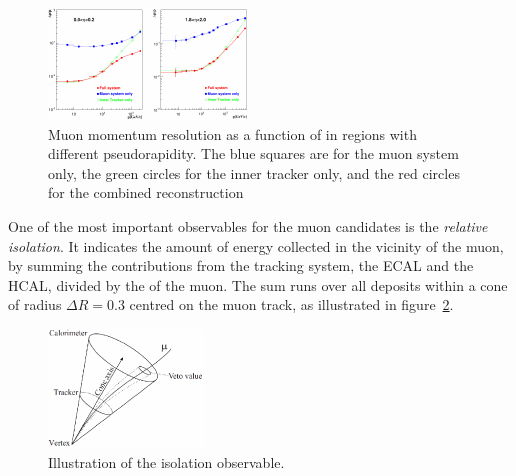 \begin{figure}[htb]
    \centering
    \includegraphics[width=\textwidth]{images/pdf/muon_momentum_resolution}
    \caption{Muon momentum resolution as a function of \pt in regions with
    different pseudorapidity. The blue squares are for the muon system only,
the green circles for the inner tracker only, and the red circles for the
combined reconstruction}
    \label{fig:muon_resolution}
\end{figure}

One of the most important observables for the muon candidates is the
\emph{relative isolation}. It indicates the amount of energy collected in
the vicinity of the muon, by summing the contributions from the tracking
system, the ECAL and the HCAL, divided by the \pt of the muon.
The sum runs over all deposits within a cone of radius $\Delta R = 0.3$
centred on the muon track, as illustrated in figure~\ref{fig:muon_isolation}.

\begin{figure}[htb]
    \centering
    \includegraphics[width=.5\textwidth]{images/pdf/muon_isolation}
    \caption{Illustration of the isolation observable.}
    \label{fig:muon_isolation}
\end{figure}


